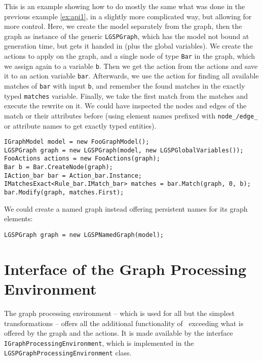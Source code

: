 \begin{example}
This is an example showing how to do mostly the same what was done in the previous example \ref{ex:api1}, in a slightly more complicated way, but allowing for more control.
Here, we create the model separately from the graph, then the graph as instance of the generic \texttt{LGSPGraph}, which has the model not bound at generation time, but gets it handed in (plus the global variables).
We create the actions to apply on the graph, and a single node of type \texttt{Bar} in the graph, which we assign again to a variable \texttt{b}.
Then we get the action from the actions and save it to an action variable \texttt{bar}.
Afterwards, we use the action for finding all available matches of \texttt{bar} with input \texttt{b}, and remember the found matches in the exactly typed \texttt{matches} variable.
Finally, we take the first match from the matches and execute the rewrite on it.
We could have inspected the nodes and edges of the match or their attributes before (using element names prefixed with \texttt{node\_/edge\_} or attribute names to get exactly typed entities). 
\begin{verbatim}
IGraphModel model = new FooGraphModel();
LGSPGraph graph = new LGSPGraph(model, new LGSPGlobalVariables());
FooActions actions = new FooActions(graph);
Bar b = Bar.CreateNode(graph);
IAction_bar bar = Action_bar.Instance;
IMatchesExact<Rule_bar.IMatch_bar> matches = bar.Match(graph, 0, b);
bar.Modify(graph, matches.First);
\end{verbatim}

We could create a named graph instead offering persistent names for its graph elements:
\begin{verbatim}
LGSPGraph graph = new LGSPNamedGraph(model);
\end{verbatim}
\end{example}

\section{Interface of the Graph Processing Environment}\label{sec:procenv}

The graph processing environment -- which is used for all but the simplest transformations -- offers all the additional functionality of \GrG~exceeding what is offered by the graph and the actions.
It is made available by the interface \texttt{IGraphProcessingEnvironment}, which is implemented in the \texttt{LGSPGraphProcessing\-Environment} class.

